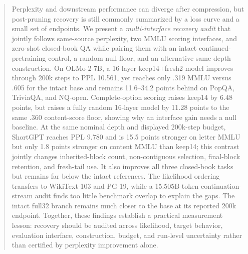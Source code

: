 \begin{abstract}
Perplexity and downstream performance can diverge after compression, but
post-pruning recovery is still commonly summarized by a loss curve and a small
set of endpoints. We present a \emph{multi-interface recovery audit} that
jointly follows same-source perplexity, two MMLU scoring
interfaces, and zero-shot closed-book QA while pairing them with an intact
continued-pretraining control, a random null floor, and an alternative
same-depth construction. On OLMo-2-7B, a 16-layer keep14+fresh2 model improves
through 200k steps to PPL 10.561, yet reaches only .319 MMLU versus .605 for the
intact base and remains 11.6--34.2 points behind on PopQA, TriviaQA, and
NQ-open. Complete-option scoring raises keep14 by 6.48 points, but raises a
fully random 16-layer model by 11.28 points to the same .360 content-score
floor, showing why an interface gain needs a null baseline. At the same nominal
depth and displayed 200k-step budget, ShortGPT reaches PPL 9.780 and is
15.5 points stronger on letter MMLU but only 1.8 points stronger on content
MMLU than keep14; this contrast jointly changes inherited-block count,
non-contiguous selection, final-block retention, and fresh-tail use. It also
improves all three closed-book tasks but remains far below the intact
references. The likelihood ordering transfers to WikiText-103 and PG-19, while
a 15.505B-token continuation-stream audit finds too little benchmark overlap
to explain the gaps. The intact full32 branch remains much
closer to the base at its reported 200k endpoint. Together, these findings
establish a practical measurement lesson: recovery should be audited across
likelihood, target behavior, evaluation interface, construction, budget, and
run-level uncertainty rather than certified by perplexity improvement alone.
\end{abstract}

